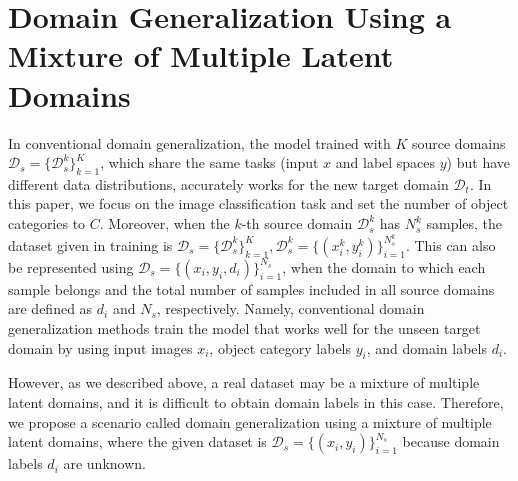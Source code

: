 \documentclass[letterpaper]{article} \usepackage{aaai20}  \usepackage{times}  \usepackage{helvet} \usepackage{courier}  \usepackage[hyphens]{url}  \usepackage{graphicx} \urlstyle{rm} \def\UrlFont{\rm}  \usepackage{graphicx}  \usepackage[whole]{bxcjkjatype}
\begin{document}
\section{Domain Generalization Using a Mixture of Multiple Latent Domains}
In conventional domain generalization, the model trained with $K$ source domains $\mathcal{D}_s=\{\mathcal{D}_s^k\}_{k=1}^K$, which share the same tasks (input $x$ and label spaces $y$) but have different data distributions, accurately works for the new target domain $\mathcal{D}_t$. In this paper, we focus on the image classification task and set the number of object categories to $C$. Moreover, when the $k$-th source domain $\mathcal{D}_s^k$ has $N_s^k$ samples, the dataset given in training is $\mathcal{D}_s=\{\mathcal{D}_s^k\}_{k=1}^K, \mathcal{D}_s^k=\{(x_i^k,y_i^k)\}_{i=1}^{N_s^k}$.
This can also be represented using $\mathcal{D}_s=\{(x_i,y_i,d_i)\}_{i=1}^{N_s}$, when the domain to which each sample belongs and the total number of samples included in all source domains are defined as $d_i$ and $N_s$, respectively. Namely, conventional domain generalization methods train the model that works well for the unseen target domain by using input images $x_i$, object category labels $y_i$, and domain labels $d_i$.\par
However, as we described above, a real dataset may be a mixture of multiple latent domains, and it is difficult to obtain domain labels in this case. Therefore, we propose a scenario called domain generalization using a mixture of multiple latent domains, where the given dataset is $\mathcal{D}_s=\{(x_i,y_i)\}_{i=1}^{N_s}$ because domain labels $d_i$ are unknown.\par
\end{document}
